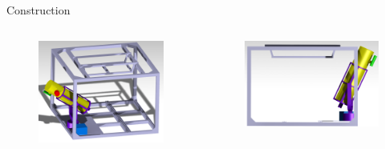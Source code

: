 \documentclass[11pt, aspectratio=169]{beamer}
\begin{document}
\begin{frame}{Construction}
\vspace{-2cm}
\begin{columns}[t]
	\begin{column}{0.4\textwidth}
		\begin{figure}
		\centering		\includegraphics[scale=0.9]{figures/CAD/Inside_Gondola/Iso1.png}
		\end{figure}
	\end{column}
	
	\begin{column}{0.4\textwidth}
		\begin{figure}
		\centering
		\vspace{0.5cm}
	\includegraphics[scale=0.9]{figures/CAD/Inside_Gondola/Vertical_lim.png}
		\end{figure}
	\end{column}
\end{columns}
\end{frame}
\end{document}
